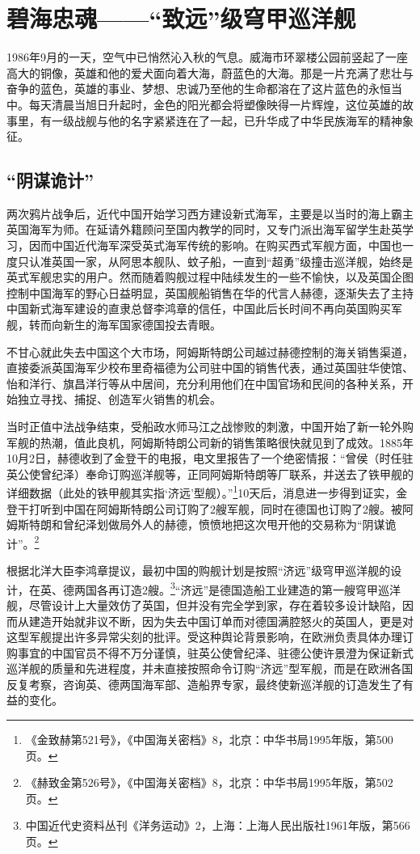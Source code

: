 \documentclass[12pt,UTF8]{ctexbook}
\begin{document}
\chapter{碧海忠魂——“致远”级穹甲巡洋舰}

1986年9月的一天，空气中已悄然沁入秋的气息。威海市环翠楼公园前竖起了一座高大的铜像，英雄和他的爱犬面向着大海，蔚蓝色的大海。那是一片充满了悲壮与奋争的蓝色，英雄的事业、梦想、忠诚乃至他的生命都溶在了这片蓝色的永恒当中。每天清晨当旭日升起时，金色的阳光都会将塑像映得一片辉煌，这位英雄的故事里，有一级战舰与他的名字紧紧连在了一起，已升华成了中华民族海军的精神象征。

\section{“阴谋诡计”}

两次鸦片战争后，近代中国开始学习西方建设新式海军，主要是以当时的海上霸主英国海军为师。在延请外籍顾问至国内教学的同时，又专门派出海军留学生赴英学习，因而中国近代海军深受英式海军传统的影响。在购买西式军舰方面，中国也一度只认准英国一家，从阿思本舰队、蚊子船，一直到“超勇”级撞击巡洋舰，始终是英式军舰忠实的用户。然而随着购舰过程中陆续发生的一些不愉快，以及英国企图控制中国海军的野心日益明显，英国舰船销售在华的代言人赫德，逐渐失去了主持中国新式海军建设的直隶总督李鸿章的信任，中国此后长时间不再向英国购买军舰，转而向新生的海军国家德国投去青眼。

不甘心就此失去中国这个大市场，阿姆斯特朗公司越过赫德控制的海关销售渠道，直接委派英国海军少校布里奇福德为公司驻中国的销售代表，通过英国驻华使馆、怡和洋行、旗昌洋行等从中居间，充分利用他们在中国官场和民间的各种关系，开始独立寻找、捕捉、创造军火销售的机会。

当时正值中法战争结束，受船政水师马江之战惨败的刺激，中国开始了新一轮外购军舰的热潮，值此良机，阿姆斯特朗公司新的销售策略很快就见到了成效。1885年10月2日，赫德收到了金登干的电报，电文里报告了一个绝密情报：“曾侯（时任驻英公使曾纪泽）奉命订购巡洋舰等，正同阿姆斯特朗等厂联系，并送去了铁甲舰的详细数据（此处的铁甲舰其实指‘济远’型舰）。”\footnote{《金致赫第521号》，《中国海关密档》8，北京：中华书局1995年版，第500页。}10天后，消息进一步得到证实，金登干打听到中国在阿姆斯特朗公司订购了2艘军舰，同时在德国也订购了2艘。被阿姆斯特朗和曾纪泽划做局外人的赫德，愤愤地把这次甩开他的交易称为“阴谋诡计”。\footnote{《赫致金第526号》，《中国海关密档》8，北京：中华书局1995年版，第502页。}

根据北洋大臣李鸿章提议，最初中国的购舰计划是按照“济远”级穹甲巡洋舰的设计，在英、德两国各再订造2艘。\footnote{中国近代史资料丛刊《洋务运动》2，上海：上海人民出版社1961年版，第566页。}“济远”是德国造船工业建造的第一艘穹甲巡洋舰，尽管设计上大量效仿了英国，但并没有完全学到家，存在着较多设计缺陷，因而从建造开始就非议不断，因为失去中国订单而对德国满腔怒火的英国人，更是对这型军舰提出许多异常尖刻的批评。受这种舆论背景影响，在欧洲负责具体办理订购事宜的中国官员不得不万分谨慎，驻英公使曾纪泽、驻德公使许景澄为保证新式巡洋舰的质量和先进程度，并未直接按照命令订购“济远”型军舰，而是在欧洲各国反复考察，咨询英、德两国海军部、造船界专家，最终使新巡洋舰的订造发生了有益的变化。
\end{document}

